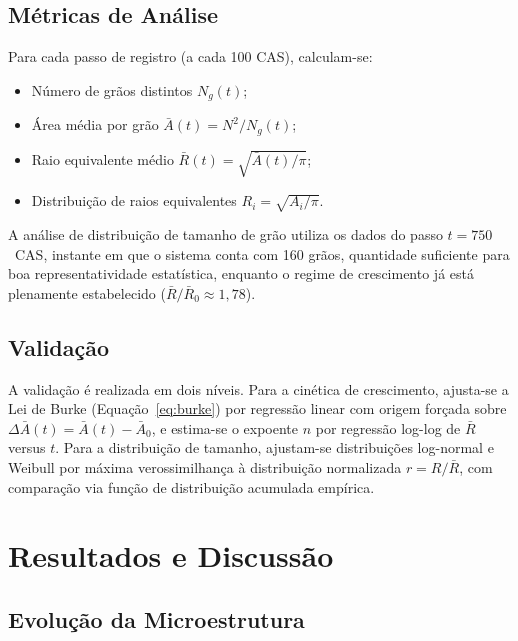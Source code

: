 \documentclass[12pt,a4paper]{article}
\begin{document}
\subsection{Métricas de Análise}

Para cada passo de registro (a cada 100 CAS), calculam-se:
\begin{itemize}
    \item Número de grãos distintos $N_g(t)$;
    \item Área média por grão $\bar{A}(t) = N^2 / N_g(t)$;
    \item Raio equivalente médio $\bar{R}(t) = \sqrt{\bar{A}(t)/\pi}$;
    \item Distribuição de raios equivalentes $R_i = \sqrt{A_i/\pi}$.
\end{itemize}

A análise de distribuição de tamanho de grão utiliza os dados do passo $t = 750$~CAS,
instante em que o sistema conta com 160 grãos, quantidade suficiente para boa
representatividade estatística, enquanto o regime de crescimento já está plenamente
estabelecido ($\bar{R}/\bar{R}_0 \approx 1{,}78$).

\subsection{Validação}

A validação é realizada em dois níveis. Para a cinética de crescimento, ajusta-se
a Lei de Burke (Equação~\ref{eq:burke}) por regressão linear com origem forçada sobre
$\Delta\bar{A}(t) = \bar{A}(t) - \bar{A}_0$, e estima-se o expoente $n$ por
regressão log-log de $\bar{R}$ versus $t$. Para a distribuição de tamanho, ajustam-se
distribuições log-normal e Weibull por máxima verossimilhança à distribuição normalizada
$r = R/\bar{R}$, com comparação via função de distribuição acumulada empírica.

\newpage

\section{Resultados e Discussão}
\label{sec:resultados}

\subsection{Evolução da Microestrutura}
\end{document}
